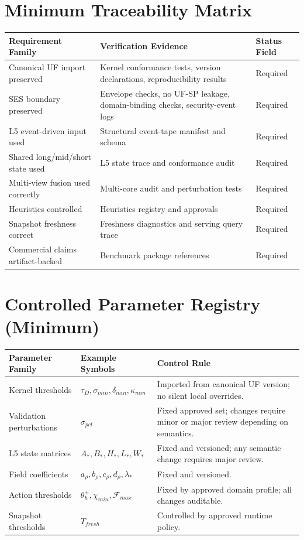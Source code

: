 \documentclass[11pt]{report}
\begin{document}
\chapter{Minimum Traceability Matrix}
\begin{longtable}{p{}p{}p{}}
\toprule
Requirement Family & Verification Evidence & Status Field \\
\midrule
Canonical UF import preserved & Kernel conformance tests, version declarations, reproducibility results & Required \\
SES boundary preserved & Envelope checks, no UF-SP leakage, domain-binding checks, security-event logs & Required \\
L5 event-driven input used & Structural event-tape manifest and schema & Required \\
Shared long/mid/short state used & L5 state trace and conformance audit & Required \\
Multi-view fusion used correctly & Multi-core audit and perturbation tests & Required \\
Heuristics controlled & Heuristics registry and approvals & Required \\
Snapshot freshness correct & Freshness diagnostics and serving query trace & Required \\
Commercial claims artifact-backed & Benchmark package references & Required \\
\bottomrule
\end{longtable}
\chapter{Controlled Parameter Registry (Minimum)}
\begin{longtable}{p{}p{}p{}}
\toprule
Parameter Family & Example Symbols & Control Rule \\
\midrule
Kernel thresholds & $\tau_D,\sigma_{min},\delta_{min},\kappa_{min}$ & Imported from canonical UF version; no silent local overrides. \\
Validation perturbations & $\sigma_{pct}$ & Fixed approved set; changes require minor or major review depending on semantics. \\
L5 state matrices & $A_*,B_*,H_*,L_*,W_*$ & Fixed and versioned; any semantic change requires major review. \\
Field coefficients & $a_\rho,b_\rho,c_\rho,d_\rho,\lambda_*$ & Fixed and versioned. \\
Action thresholds & $\theta_h^{\pm},\chi_{min},\mathcal{F}_{max}$ & Fixed by approved domain profile; all changes auditable. \\
Snapshot thresholds & $T_{fresh}$ & Controlled by approved runtime policy. \\
\bottomrule
\end{longtable}
\end{document}
